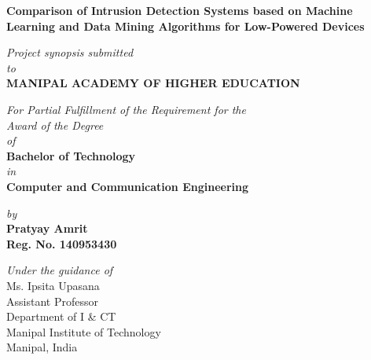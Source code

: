 \documentclass[a4paper,12pt]{article}
\begin{document}
	\begin{titlepage}

		\vspace*{2cm}
		\begin{center}
		\large{\textbf{Comparison of Intrusion Detection Systems based on Machine Learning and Data Mining Algorithms for Low-Powered Devices}}
		\end{center}
		\vspace{0.5cm}
		\begin{center}
		\small{\textit{Project synopsis submitted} \\ \vspace{0.25cm} \textit{to} \\ \vspace{0.25cm}\textbf{MANIPAL ACADEMY OF HIGHER EDUCATION} \\}
		\end{center}
		\vspace{0.25cm}
		\begin{center}
		\small{\textit{For Partial Fulfillment of the Requirement for the\\ \vspace{0.25cm}Award of the Degree\\ \vspace{0.25cm}of}} \\ \vspace{0.25cm}
		\textbf{Bachelor of Technology} \\  \vspace{0.25cm} \textit{in} \\ \textbf{Computer and Communication Engineering}
		\end{center}
		\begin{center}
		\small{\textit{by}} \\
		\textbf{Pratyay Amrit} \\ \textbf{Reg. No. 140953430} \\
		\end{center}

		\begin{center}
		\small{\textit{Under the guidance of}} \\
		\renewcommand{\baselinestretch}{1}
		\vspace{0.5cm}
		Ms. Ipsita Upasana \\
		Assistant Professor \\
		Department of I \& CT \\
		 Manipal Institute of Technology \\
		Manipal, India
		\end{center}


\end{titlepage}
\end{document}
